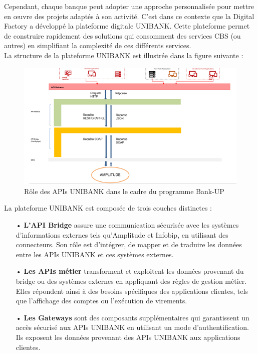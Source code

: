 Cependant, chaque banque peut adopter une approche personnalisée pour mettre en œuvre des projets adaptés à son activité. C'est dans ce contexte que la Digital Factory a développé la plateforme digitale UNIBANK. Cette plateforme permet de construire rapidement des solutions qui consomment des services CBS (ou autres) en simplifiant la complexité de ces différents services.\\

La structure de la plateforme UNIBANK est illustrée dans la figure suivante :

\begin{figure}[!h]
    \centering %
        \includegraphics[width=16cm]{images/conception/architectureUNIBANK.png}
    \caption{Rôle des APIs UNIBANK dans le cadre du programme Bank-UP}
\end{figure}
\newpage

La plateforme UNIBANK est composée de trois couches distinctes :

\begin{itemize}
    \item[•] \textbf{L'API Bridge} assure une communication sécurisée avec les systèmes d'informations externes tels qu'Amplitude et Infobip, en utilisant des connecteurs. Son rôle est d'intégrer, de mapper et de traduire les données entre les APIs UNIBANK et ces systèmes externes.
    \item[•] \textbf{Les APIs métier} transforment et exploitent les données provenant du bridge ou des systèmes externes en appliquant des règles de gestion métier. Elles répondent ainsi à des besoins spécifiques des applications clientes, tels que l'affichage des comptes ou l'exécution de virements.
    \item[•] \textbf{ Les Gateways} sont des composants supplémentaires qui garantissent un accès sécurisé aux APIs UNIBANK en utilisant un mode d'authentification. Ils exposent les données provenant des APIs UNIBANK aux applications clientes.
\end{itemize}

